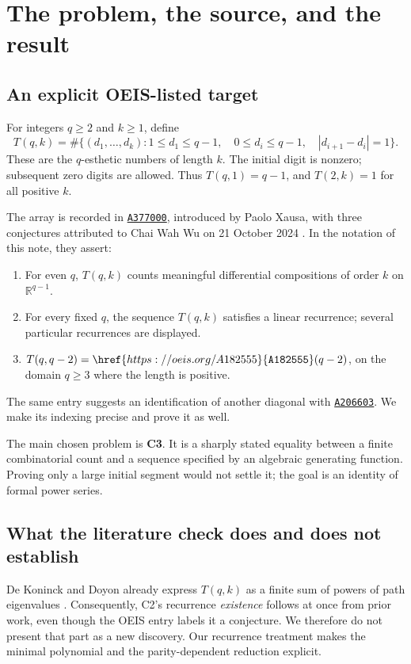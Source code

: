 \documentclass[11pt,letterpaper]{article}
\numberwithin{equation}{section}
\theoremstyle{definition}
\newcommand{\R}{\mathbb R}
\newcommand{\OEIS}[1]{\href{https://oeis.org/#1}{\texttt{#1}}}
\begin{document}
\begingroup
\small
\setlength{\parskip}{0pt}
\tableofcontents
\endgroup
\newpage

\section{The problem, the source, and the result}
\label{sec:problem}

\subsection{An explicit OEIS-listed target}
For integers $q\ge2$ and $k\ge1$, define
\begin{equation}\label{eq:definition}
T(q,k)=\#\{(d_1,\ldots,d_k):
 1\le d_1\le q-1,\quad 0\le d_i\le q-1,\quad
 |d_{i+1}-d_i|=1\}.
\end{equation}
These are the $q$-esthetic numbers of length $k$.  The initial digit is
nonzero; subsequent zero digits are allowed.  Thus $T(q,1)=q-1$, and
$T(2,k)=1$ for all positive $k$.

The array is recorded in \OEIS{A377000}, introduced by Paolo Xausa, with
three conjectures attributed to Chai Wah Wu on 21 October 2024
\cite{oeis377000}.  In the notation of this note, they assert:
\begin{enumerate}[label=\textbf{C\arabic*.},leftmargin=3em]
\item For even $q$, $T(q,k)$ counts meaningful differential compositions of
order $k$ on $\R^{q-1}$.
\item For every fixed $q$, the sequence $T(q,k)$ satisfies a linear
recurrence; several particular recurrences are displayed.
\item $T(q,q-2)=\OEIS{A182555}(q-2)$, on the domain $q\ge3$ where the
length is positive.
\end{enumerate}
The same entry suggests an identification of another diagonal with
\OEIS{A206603}.  We make its indexing precise and prove it as well.

The main chosen problem is \textbf{C3}.  It is a sharply stated equality
between a finite combinatorial count and a sequence specified by an
algebraic generating function.  Proving only a large initial segment
would not settle it; the goal is an identity of formal power series.

\subsection{What the literature check does and does not establish}
De Koninck and Doyon already express $T(q,k)$ as a finite sum of powers of
path eigenvalues \cite[Eq.~(17)]{dek}.  Consequently, C2's recurrence
\emph{existence} follows at once from prior work, even though the OEIS
entry labels it a conjecture.  We therefore do not present that part as a
new discovery.  Our recurrence treatment makes the minimal polynomial
and the parity-dependent reduction explicit.
\end{document}
